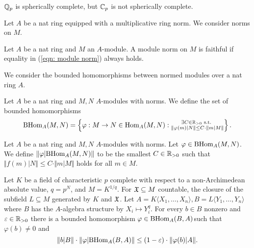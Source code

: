\begin{example}
    $\mathbb{Q}_{p}$ is spherically complete, but $\mathbb{C}_{p}$ is not spherically complete. 
\end{example}
Let $A$ be a nat ring  equipped with a multiplicative ring norm. We consider norms on $M$. 
\begin{definition}\label{def: faithful module norm}
    Let $A$ be a nat ring and $M$ an $A$-module. A module norm on $M$ is faithful if equality in (\ref{eqn: module norm}) always holds. 
\end{definition}
We consider the bounded homomorphisms between normed modules over a nat ring $A$. 
\begin{definition}\label{def: bounded module homomorphisms}
    Let $A$ be a nat ring and $M,N$ $A$-modules with norms. We define the set of bounded homomorphisms 
    \begin{equation}\label{eqn: def of BHom}
        \mathrm{BHom}_{A}(M,N)=\left\{\varphi:M\to N\in\mathrm{Hom}_{A}(M,N):\substack{\exists C\in\mathbb{R}_{>0}\text{ s.t. }\\ \Vert \varphi(m)|N\Vert\leq C\cdot\Vert m|M\Vert}\right\}.
    \end{equation}
\end{definition}
\begin{definition}\label{def: norm of Homomorphism}
    Let $A$ be a nat ring and $M,N$ $A$-modules with norms. Let $\varphi\in\mathrm{BHom}_{A}(M,N)$. We define $\Vert\varphi|\mathrm{BHom}_{A}(M,N)\Vert$ to be the smallest $C\in\mathbb{R}_{>0}$ such that $\Vert f(m)|N\Vert\leq C\cdot\Vert m|M\Vert$ holds for all $m\in M$. 
\end{definition}
\begin{lemma}\label{lem: p-power roots}
    Let $K$ be a field of characteristic $p$ complete with respect to a non-Archimedean absolute value, $q=p^{N}$, and $M=K^{1/q}$. For $\mathfrak{X}\subseteq M$ countable, the closure of the subfield $L\subseteq M$ generated by $K$ and $\mathfrak{X}$. Let $A=K\langle X_{1},\dots,X_{n}\rangle, B=L\langle Y_{1},\dots,Y_{n}\rangle$ where $B$ has the $A$-algebra structure by $X_{i}\mapsto Y_{i}^{q}$. For every $b\in B$ nonzero and $\varepsilon\in\mathbb{R}_{>0}$ there is a bounded homomorphism $\varphi\in\mathrm{BHom}_{A}(B,A)$such that $\varphi(b)\neq0$ and 
    $$\Vert b|B\Vert\cdot\Vert\varphi|\mathrm{BHom}_{A}(B,A)\Vert\leq(1-\varepsilon)\cdot\Vert\varphi(b)|A\Vert.$$
\end{lemma}
